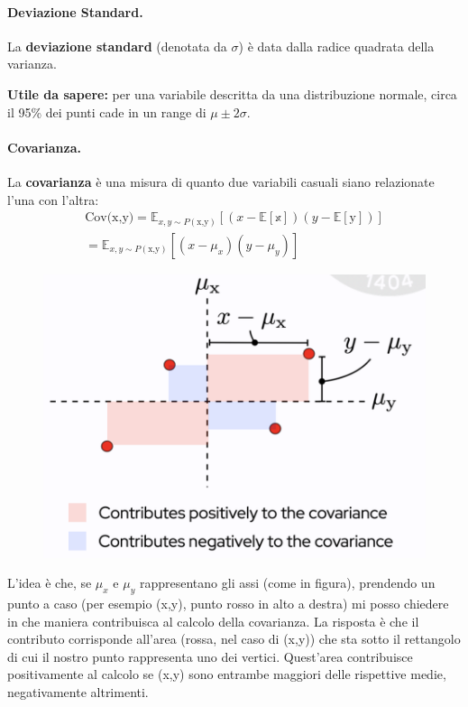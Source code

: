 \paragraph{Deviazione Standard.}
La \textbf{deviazione standard} (denotata da $\sigma$) è data dalla radice quadrata della varianza.


\textbf{Utile da sapere:} per una variabile descritta da una distribuzione normale, circa il 95\% dei punti cade in un range di $\mu \pm2\sigma$.



\paragraph{Covarianza.} La \textbf{covarianza} è una misura di quanto due variabili casuali siano relazionate l'una con l'altra:
\begin{gather}
    \text{Cov(x,y)}=\mathbb{E}_{x,y\sim P(\text{x,y})}[(x-\mathbb{E[\text{x}]})(y-\mathbb{E}[\text{y}])]\\
    =\mathbb{E}_{x,y\sim P(\text{x,y})}[(x-\mu_x)(y-\mu_y)]
\end{gather}
\begin{figure}[!h]
    \includegraphics[scale=.5]{images/prerequisites/covariance.png}
    \centering
\end{figure}



L'idea è che, se $\mu_x$ e $\mu_y$ rappresentano gli assi (come in figura), prendendo un punto a caso (per esempio (x,y), punto rosso in alto a destra) mi posso chiedere in che maniera contribuisca al calcolo della covarianza. La risposta è che il contributo corrisponde all'area (rossa, nel caso di (x,y)) che sta sotto il rettangolo di cui il nostro punto rappresenta uno dei vertici. Quest'area contribuisce positivamente al calcolo se (x,y) sono entrambe maggiori delle rispettive medie, negativamente altrimenti.



